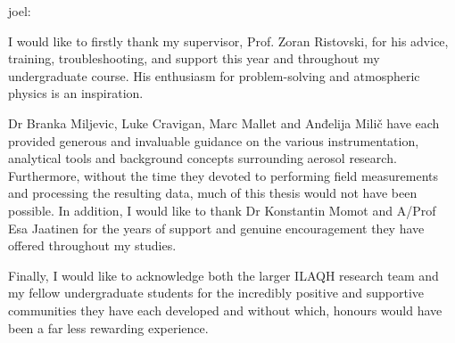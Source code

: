joel:

I would like to firstly thank my supervisor, Prof. Zoran Ristovski, for his advice, training, troubleshooting, and support this year and throughout my undergraduate course. His enthusiasm for problem-solving and atmospheric physics is an inspiration.

Dr Branka Miljevic, Luke Cravigan, Marc Mallet and Anđelija Milič have each provided generous and invaluable guidance on the various instrumentation, analytical tools and background concepts surrounding aerosol research. Furthermore, without the time they devoted to performing field measurements and processing the resulting data, much of this thesis would not have been possible. In addition, I would like to thank Dr Konstantin Momot and A/Prof Esa Jaatinen for the years of support and genuine encouragement they have offered throughout my studies.

Finally, I would like to acknowledge both the larger ILAQH research team and my fellow undergraduate students for the incredibly positive and supportive communities they have each developed and without which, honours would have been a far less rewarding experience.